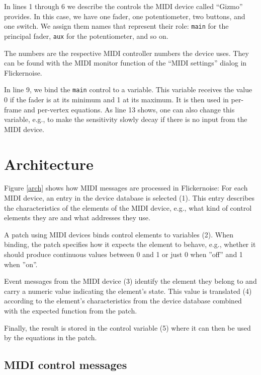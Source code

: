 \documentclass[11pt,a4paper]{article}
\begin{document}
In lines 1 through 6 we describe the controls the MIDI device called
``Gizmo'' provides. In this case, we have one fader, one potentiometer,
two buttons, and one switch. We assign them names that represent their
role: {\tt main}
for the principal fader, {\tt aux} for the potentiometer, and so on.

The numbers are the respective MIDI controller numbers the device uses.
They can be found with the MIDI monitor function of the ``MIDI settings''
dialog in Flickernoise.

In line 9, we bind the {\tt main} control to a variable. This variable
receives the value 0 if the fader is at its minimum and 1 at its maximum.
It is
then used in per-frame and per-vertex equations. As line 13 shows, one
can also change this variable, e.g., to make the sensitivity slowly decay
if there is no input from the MIDI device.




\figarch


\section{Architecture}

Figure \ref{arch} shows how MIDI messages are processed in Flickernoise:
For each MIDI device, an entry in the device database is selected (1).
This entry describes the characteristics of the elements of the MIDI
device, e.g., what kind of control elements they are and what
addresses they use.

A patch using MIDI devices binds control elements to variables (2).
When binding, the patch specifies how it expects the element to
behave, e.g., whether it should produce continuous values between
0 and 1 or just 0 when ''off'' and 1 when ''on''.

Event messages from the MIDI device (3) identify the element they
belong to and carry a numeric value indicating the element's state.
This value is translated (4) according to the element's characteristics
from the device database combined with the expected function from
the patch.

Finally, the result is stored in the control variable (5) where it can
then be used by the equations in the patch.




\subsection{MIDI control messages}
\end{document}
